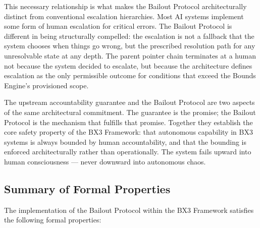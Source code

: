 This necessary relationship is what makes the Bailout Protocol architecturally
distinct from conventional escalation hierarchies. Most AI systems implement some
form of human escalation for critical errors. The Bailout Protocol is different in
being structurally compelled: the escalation is not a fallback that the system
chooses when things go wrong, but the prescribed resolution path for any
unresolvable state at any depth. The parent pointer chain terminates at a human not
because the system decided to escalate, but because the architecture defines
escalation as the only permissible outcome for conditions that exceed the Bounds
Engine's provisioned scope.

The upstream accountability guarantee and the Bailout Protocol are two aspects of
the same architectural commitment. The guarantee is the promise; the Bailout Protocol
is the mechanism that fulfills that promise. Together they establish the core safety
property of the BX3 Framework: that autonomous capability in BX3 systems is always
bounded by human accountability, and that the bounding is enforced architecturally
rather than operationally. The system fails upward into human consciousness — never
downward into autonomous chaos.

\subsection{Summary of Formal Properties}
\label{sec:properties-summary}

The implementation of the Bailout Protocol within the BX3 Framework satisfies the
following formal properties:

